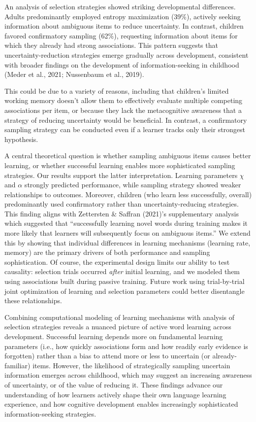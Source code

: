 \documentclass[10pt, letterpaper]{article}
\begin{document}
An analysis of selection strategies showed striking developmental
differences. Adults predominantly employed entropy maximization (39\%),
actively seeking information about ambiguous items to reduce
uncertainty. In contrast, children favored confirmatory sampling (62\%),
requesting information about items for which they already had strong
associations. This pattern suggests that uncertainty-reduction
strategies emerge gradually across development, consistent with broader
findings on the development of information-seeking in childhood (Meder
et al., 2021; Nussenbaum et al., 2019).

This could be due to a variety of reasons, including that children's
limited working memory doesn't allow them to effectively evaluate
multiple competing associations per item, or because they lack the
metacognitive awareness that a strategy of reducing uncertainty would be
beneficial. In contrast, a confirmatory sampling strategy can be
conducted even if a learner tracks only their strongest hypothesis.

A central theoretical question is whether sampling ambiguous items
causes better learning, or whether successful learning enables more
sophisticated sampling strategies. Our results support the latter
interpretation. Learning parameters \(\chi\) and \(\alpha\) strongly
predicted performance, while sampling strategy showed weaker
relationships to outcomes. Moreover, children (who learn less
successfully, overall) predominantly used confirmatory rather than
uncertainty-reducing strategies. This finding aligns with Zettersten \&
Saffran (2021)'s supplementary analysis which suggested that
``successfully learning novel words during training makes it more likely
that learners will subsequently focus on ambiguous items.'' We extend
this by showing that individual differences in learning mechanisms
(learning rate, memory) are the primary drivers of both performance and
sampling sophistication. Of course, the experimental design limits our
ability to test causality: selection trials occurred \emph{after}
initial learning, and we modeled them using associations built during
passive training. Future work using trial-by-trial joint optimization of
learning and selection parameters could better disentangle these
relationships.

Combining computational modeling of learning mechanisms with analysis of
selection strategies reveals a nuanced picture of active word learning
across development. Successful learning depends more on fundamental
learning parameters (i.e., how quickly associations form and how readily
early evidence is forgotten) rather than a bias to attend more or less
to uncertain (or already-familiar) items. However, the likelihood of
strategically sampling uncertain information emerges across childhood,
which may suggest an increasing awareness of uncertainty, or of the
value of reducing it. These findings advance our understanding of how
learners actively shape their own language learning experience, and how
cognitive development enables increasingly sophisticated
information-seeking strategies.
\end{document}
